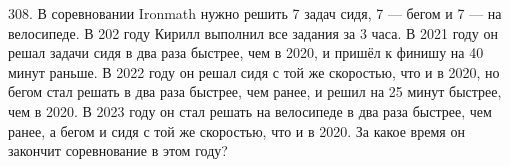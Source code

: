 308. В соревновании Ironmath нужно решить 7 задач сидя, 7 --- бегом и 7 --- на велосипеде. В 202 году Кирилл выполнил все задания за 3 часа. В 2021 году он решал задачи сидя в два раза быстрее, чем в 2020, и пришёл к финишу на 40 минут раньше. В 2022 году он решал сидя с той же скоростью, что и в 2020, но бегом стал решать в два раза быстрее, чем ранее, и решил на 25 минут быстрее, чем в 2020. В 2023 году он стал решать на велосипеде в два раза быстрее, чем ранее, а бегом и сидя с той же скоростью, что и в 2020. За какое время он закончит соревнование в этом году?\\
